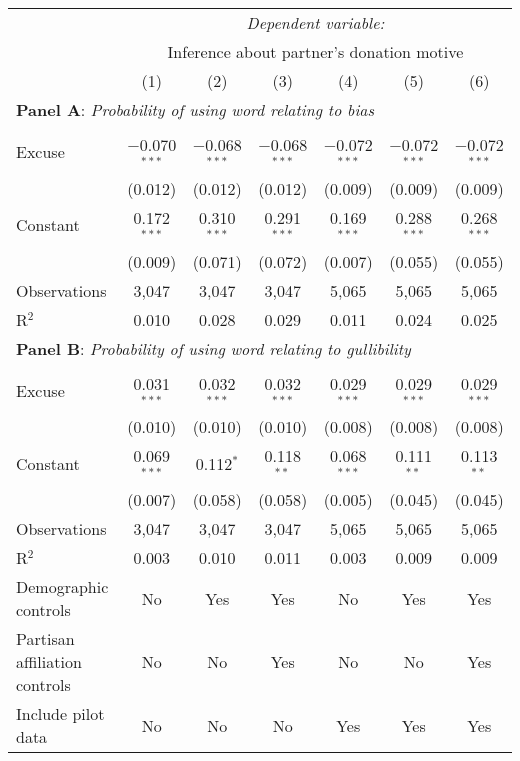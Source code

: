 \begin{table}[!htbp] \centering 
  \label{t:1-word}
\begin{threeparttable}
\begin{tabular}{@{\hspace{5pt}}l@{\hspace{5pt}}cccccc} 
\toprule 
 & \multicolumn{6}{c}{\textit{Dependent variable:}} \\ 
\cmidrule(rr){2-7} 
 & \multicolumn{6}{c}{Inference about partner's donation motive} \\ 
 & (1) & (2) & (3) & (4) & (5) & (6)\\ 
\midrule  
\midrule
\multicolumn{7}{l}{\textbf{Panel A}: \textit{Probability of using word relating to bias}} \\
\midrule
\\[-2.1ex] Excuse & $-$0.070$^{***}$ & $-$0.068$^{***}$ & $-$0.068$^{***}$ & $-$0.072$^{***}$ & $-$0.072$^{***}$ & $-$0.072$^{***}$ \\ 
  & (0.012) & (0.012) & (0.012) & (0.009) & (0.009) & (0.009) \\ 
 \addlinespace 
 Constant & 0.172$^{***}$ & 0.310$^{***}$ & 0.291$^{***}$ & 0.169$^{***}$ & 0.288$^{***}$ & 0.268$^{***}$ \\ 
  & (0.009) & (0.071) & (0.072) & (0.007) & (0.055) & (0.055) \\ 
 \addlinespace 
\midrule  
Observations & 3,047 & 3,047 & 3,047 & 5,065 & 5,065 & 5,065 \\ 
R$^{2}$ & 0.010 & 0.028 & 0.029 & 0.011 & 0.024 & 0.025 \\ 
\midrule
\midrule
\multicolumn{7}{l}{\textbf{Panel B}: \textit{Probability of using word relating to gullibility}} \\
\midrule
\\[-2.1ex] Excuse & 0.031$^{***}$ & 0.032$^{***}$ & 0.032$^{***}$ & 0.029$^{***}$ & 0.029$^{***}$ & 0.029$^{***}$ \\ 
  & (0.010) & (0.010) & (0.010) & (0.008) & (0.008) & (0.008) \\ 
 \addlinespace 
 Constant & 0.069$^{***}$ & 0.112$^{*}$ & 0.118$^{**}$ & 0.068$^{***}$ & 0.111$^{**}$ & 0.113$^{**}$ \\ 
  & (0.007) & (0.058) & (0.058) & (0.005) & (0.045) & (0.045) \\ 
 \addlinespace 
\midrule  
Observations & 3,047 & 3,047 & 3,047 & 5,065 & 5,065 & 5,065 \\ 
R$^{2}$ & 0.003 & 0.010 & 0.011 & 0.003 & 0.009 & 0.009 \\ 
\midrule
\midrule
Demographic controls & No & Yes & Yes & No & Yes & Yes \\ 
Partisan affiliation controls & No & No & Yes & No & No & Yes \\ 
Include pilot data & No & No & No & Yes & Yes & Yes \\
\bottomrule 
\end{tabular} 
\end{threeparttable}
\end{table} 
